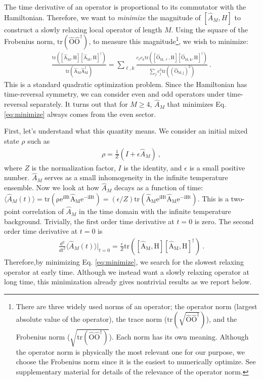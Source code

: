 \documentclass[twocolumn,superscriptaddress, prb]{revtex4-1}
\begin{document}
The time derivative of an operator is proportional to its commutator with the Hamiltonian.
Therefore, we want to {\it minimize} the magnitude of $[\hat{A}_M, H]$
to construct a slowly relaxing local operator of length $M$.
Using the square of the Frobenius norm, $\mathrm{tr(\hat{O}\hat{O}^\dag)}$, to measure this magnitude\footnote{There are three widely used norms of an operator;
the operator norm (largest absolute value of the operator), the trace norm ($\mathrm{tr(\sqrt{\hat{O}\hat{O}^\dag})}$),
and the Frobenius norm ($\sqrt{\mathrm{tr(\hat{O}\hat{O}^\dag)}}$). Each norm has its own meaning.
Although the operator norm is physically the most relevant one for our purpose,
we choose the Frobenius norm since it is the easiest to numerically optimize.
See supplementary material for details of the relevance of the operator norm.},
we wish to minimize:
\begin{align}\label{eq:minimize}
\frac{\mathrm{tr([\hat{A}_M,H][\hat{A}_M,H]^\dag)}}{\mathrm{tr(\hat{A}_M\hat{A}^\dag_M)}} = \sum_{\ell,k}\frac{c_\ell c_k \mathrm{tr([\hat{O}_{M,\ell},H][\hat{O}_{M,k},H]^\dag)}}{\sum_j c_j ^2 \mathrm{tr((\hat{O}_{M,j})^2)}} ~.
\end{align}
This is a standard quadratic optimization problem.
Since the Hamiltonian has time-reversal symmetry,
we can consider even and odd operators under time-reversal separately.
It turns out that for $M\geq 4$, $\hat{A}_M$ that minimizes Eq. \eqref{eq:minimize} always comes from the even sector.

First, let's understand what this quantity means.
We consider an initial mixed state $\rho$ such as
\begin{align}\label{eq:initial}
\rho = \frac{1}{Z}\left(I + \epsilon \hat{A}_M\right) ~,
\end{align}
where $Z$ is the normalization factor, $I$ is the identity, and $\epsilon$ is a small positive number.
$\hat{A}_M$ serves as a small inhomogeneity in the infinite temperature ensemble.
Now we look at how $\hat{A}_M$ decays as a function of time:
$\langle \hat{A}_M(t) \rangle = \mathrm{tr(\rho e^{iHt} \hat{A}_M e^{-iHt})} = (\epsilon/Z)\mathrm{tr(\hat{A}_M e^{iHt} \hat{A}_M e^{-iHt})}$.
This is a two-point correlation of $\hat{A}_M$ in the time domain with the infinite temperature background.
Trivially, the first order time derivative at $t = 0$ is zero. The second order time derivative at $t = 0$ is
\begin{align}
\frac{d^2}{dt^2}\langle \hat{A}_M(t)\rangle\bigg|_{t=0} = \frac{\epsilon}{Z}\mathrm{tr([\hat{A}_M,H][\hat{A}_M,H]^\dag)} ~.
\end{align}
Therefore,by minimizing Eq. \eqref{eq:minimize},
we search for the slowest relaxing operator at early time.
Although we instead want a slowly relaxing operator at long time,
this minimization already gives nontrivial results as we report below.
\end{document}
